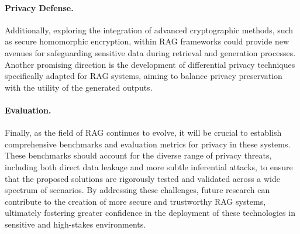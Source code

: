\paragraph{Privacy Defense.} Additionally, exploring the integration of advanced cryptographic methods, such as secure homomorphic encryption, within RAG frameworks could provide new avenues for safeguarding sensitive data during retrieval and generation processes. Another promising direction is the development of differential privacy techniques specifically adapted for RAG systems, aiming to balance privacy preservation with the utility of the generated outputs.

\paragraph{Evaluation.} Finally, as the field of RAG continues to evolve, it will be crucial to establish comprehensive benchmarks and evaluation metrics for privacy in these systems. These benchmarks should account for the diverse range of privacy threats, including both direct data leakage and more subtle inferential attacks, to ensure that the proposed solutions are rigorously tested and validated across a wide spectrum of scenarios. By addressing these challenges, future research can contribute to the creation of more secure and trustworthy RAG systems, ultimately fostering greater confidence in the deployment of these technologies in sensitive and high-stakes environments.

